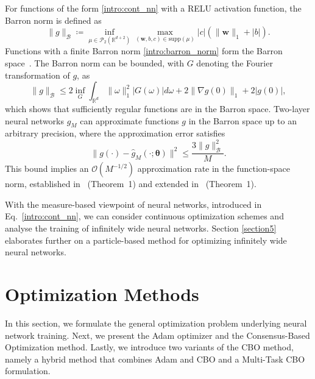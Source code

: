 \documentclass[a4paper, 11pt]{article}
\newcommand{\R}{\mathbb{R}}
\newcommand{\Pw}{\mathcal{P}_{2}\left( \R^{d+2} \right) }
\theoremstyle{plain} %
\begin{document}
	For functions of the form \eqref{intro:cont_nn} with a RELU activation function, the Barron norm is defined as
	\begin{equation}\label{intro:barron_norm}
		\|g \|_{\mathcal{B}} \coloneq \inf_{\mu \in \Pw} \max_{\left( \bm{w},b,c \right) \in \text{supp}\left( \mu \right) } |c| \left( \|\bm{w} \|_{1} + |b|\right).
	\end{equation}
	Functions with a finite Barron norm \eqref{intro:barron_norm} form the Barron space~\cite{barronUniversalApproximationBounds1993,eBarronSpaceFlowInduced2022}. The Barron norm can be bounded, with $ G $ denoting the Fourier transformation of $ g $, as 
	\begin{equation}
		\|g \|_{\mathcal{B}} \leq 2\inf_{G} \int_{\R^{d}} \| \omega \|^{2}_{1} \left| G(\omega) \right| d\omega + 2 \|\nabla g(0) \|_{1} + 2  | g(0) |,
	\end{equation}
	which shows that sufficiently regular functions are in the Barron space. Two-layer neural networks $ \hat{g}_{M} $ can approximate functions $ g $ in the Barron space up to an arbitrary precision, where the approximation error satisfies
	\begin{equation}\label{intro:approx_bound}
		\| g \left( \cdot \right) - \hat{g}_{M}\left( \cdot; \bm{\theta} \right)  \|^{2} \leq \frac{3\|g \|^{2}_{\mathcal{B}}}{M}.
	\end{equation}
	This bound implies an $\mathcal{O}(M^{-1/2})$ approximation rate in the function-space
	norm, established in~\cite{barronUniversalApproximationBounds1993} (Theorem~1) and
	extended in~\cite{eBarronSpaceFlowInduced2022} (Theorem~1).

	With the measure-based viewpoint of neural networks, introduced in Eq.~\eqref{intro:cont_nn}, we can consider continuous optimization schemes and analyse the training of infinitely wide neural networks. Section \ref{section5} elaborates further on a particle-based method for optimizing infinitely wide neural networks.


    \section{Optimization Methods}\label{section3}
	In this section, we formulate the general optimization problem underlying neural network training. Next, we present the Adam optimizer and the Consensus-Based Optimization method. Lastly, we introduce two variants of the CBO method, namely a hybrid method that combines Adam and CBO and a Multi-Task CBO formulation.  
\end{document}
